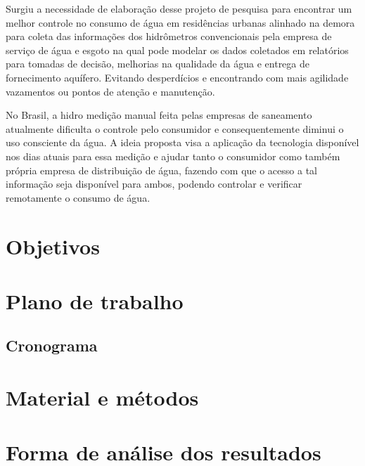 \documentclass[
	article,			%
	11pt,				%
	oneside,			%
	a4paper,			%
	english,			%
	brazil,				%
	sumario=tradicional
	]{abntex2}
\begin{document}
Surgiu a necessidade de elaboração desse projeto de pesquisa para encontrar um melhor controle no consumo de água em residências urbanas alinhado na demora para coleta das informações dos hidrômetros convencionais pela empresa de serviço de água e esgoto na qual pode modelar os dados coletados em relatórios para tomadas de decisão, melhorias na qualidade da água e entrega
de fornecimento aquífero. Evitando desperdícios e encontrando com mais agilidade vazamentos ou pontos de atenção e manutenção.

No Brasil, a hidro medição manual feita pelas empresas de saneamento atualmente dificulta o controle 
pelo consumidor e consequentemente diminui o uso consciente da água.
A ideia proposta visa a aplicação da tecnologia disponível nos dias atuais para essa medição
e ajudar tanto o consumidor como também própria empresa de distribuição de água, fazendo com que o
acesso a tal informação seja disponível para ambos, podendo controlar e verificar remotamente o consumo
de água. 

\section{Objetivos}

\section{Plano de trabalho}
\subsection{Cronograma}

\section{Material e métodos}

\section{Forma de análise dos resultados}







    
 
\end{document}
